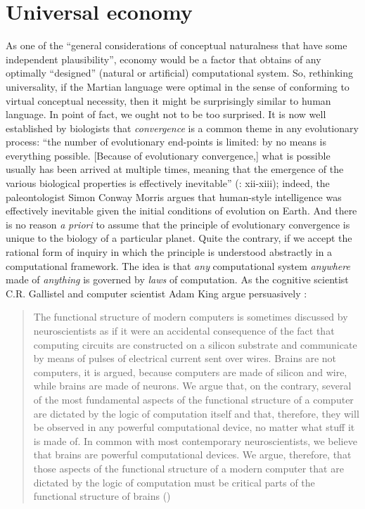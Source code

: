 \documentclass[output=paper]{langsci/langscibook}
\begin{document}
\section{Universal economy}

\largerpage
As one of the “general considerations of conceptual naturalness that have some
independent plausibility”, economy would be a factor that obtains of any
optimally “designed” (natural or artificial) computational system. So,
rethinking universality, if the Martian language were optimal in the sense of
conforming to virtual conceptual necessity, then it might be surprisingly
similar to human language. In point of fact, we ought not to be too surprised.
It is now well established by biologists that \emph{convergence} is a common
theme in any evolutionary process: “the number of evolutionary end-points is
limited: by no means is everything possible. [Because of evolutionary
convergence,] what is possible usually has been arrived at multiple times,
meaning that the emergence of the various biological properties is effectively
inevitable” (\citealt{ConwayMorris2013}: xii-xiii); indeed, the paleontologist
Simon Conway Morris argues that human-style intelligence was effectively
inevitable given the initial conditions of evolution on Earth. And there is no
reason \emph{a} \emph{priori} to assume that the principle of evolutionary
convergence is unique to the biology of a particular planet. Quite the
contrary, if we accept the rational form of inquiry in which the principle is
understood abstractly in a computational framework. The idea is that \emph{any}
computational system \emph{anywhere} made of \emph{anything} is governed by
\emph{laws} of computation. As the cognitive scientist C.R. Gallistel and
computer scientist Adam King argue persuasively
\parencite[167]{GallistelKing2010}:

\begin{quote}The functional structure of modern computers is sometimes discussed by
neuroscientists as if it were an accidental consequence of the fact that
computing circuits are constructed on a silicon substrate and communicate by
means of pulses of electrical current sent over wires. Brains are not
computers, it is argued, because computers are made of silicon and wire, while
brains are made of neurons. We argue that, on the contrary, several of the most
fundamental aspects of the functional structure of a computer are dictated by
the logic of computation itself and that, therefore, they will be observed in
any powerful computational device, no matter what stuff it is made of. In
common with most contemporary neuroscientists, we believe that brains are
powerful computational devices. We argue, therefore, that those aspects of the
functional structure of a modern computer that are dictated by the logic of
computation must be critical parts of the functional structure of brains
(\citealt[167]{GallistelKing2010})
\end{quote}
\end{document}
